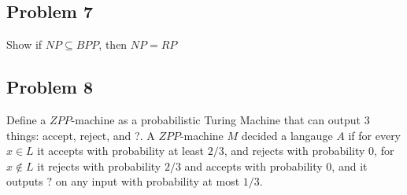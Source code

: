\documentclass[english]{article}
\begin{document}
\subsection*{Problem 7}
Show if $NP \subseteq BPP$, then $NP = RP$

\subsection*{Problem 8}
Define a $ZPP$-machine as a probabilistic Turing Machine that can output 3 things: accept, reject, and ?.
A $ZPP$-machine $M$ decided a langauge $A$ if for every $x \in L$ it accepts with probability at least $2/3$, and
rejects with probability 0, for $x \notin L$ it rejects with probability $2/3$ and accepts with probability 0, and it
outputs $?$ on any input with probability at most $1/3$.
\end{document}
